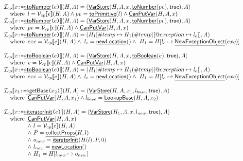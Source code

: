 \documentclass{article}
\makeatletter
\newcommand{\SF}[1]{\mbox{\textsf{#1}}}
\newcommand{\TT}[1]{\mbox{\texttt{#1}}}
\newcommand{\wherec}[1]{{\rm where}\begin{array}[t]{l}#1\end{array}}
\newcommand{\I}{\mathcal{I}}
\newcommand{\V}{\mathcal{V}}
\newcommand{\lbr}{\llbracket}
\newcommand{\rbr}{\rrbracket}
\newcommand{\hfi}[1]{\hf{\ensuremath{\diamond}#1}}
\newcommand{\hf}[1]{\underline{\sf #1}}
\newcommand{\varloc}[1]{\##1}
\newcommand{\varprop}[1]{@#1}
\newcommand{\vtrue}{\SF{true}}
\makeatother
\begin{document}
\[
\begin{array}{ll}

\I _{cp}\lbr x \TT{:=} \hfi{toNumber}\TT{(}e\TT{)} \rbr(H,A)
= (\hf{VarStore}(H,A,x,\hf{toNumber}(pv),\vtrue), A)
\\\quad\wherec{l = \V _{cp}\lbr e\rbr(H,A)\land pv=\hf{toPrimitive}(l)\land \hf{CanPutVar}(H,A,x)}\\
\I _{cp}\lbr x \TT{:=} \hfi{toNumber}\TT{(}e\TT{)} \rbr(H,A)
= (\hf{VarStore}(H,A,x,\hf{toNumber}(pv),\vtrue), A)
\\\quad\wherec{pv = \V _{cp}\lbr e\rbr(H,A)\land \hf{CanPutVar}(H,A,x)}\\
\I _{cp}\lbr x \TT{:=} \hfi{toNumber}\TT{(}e\TT{)} \rbr(H,A)
 = (H_1[\varloc{temp}\mapsto H_1(\varloc{temp})[\varprop{exception}\mapsto l_{e}]], A) \\
\quad\wherec{
  exc = \V_{cp}\lbr e\rbr(H,A) 
  \land\ l_e = \hf{newLocation}()
  \land\ H_1=H[l_e\mapsto\hf{NewExceptionObject}(exc)] \\
}
\\\\

\I _{cp}\lbr x \TT{:=} \hfi{toBoolean}\TT{(}e\TT{)} \rbr(H,A)
= (\hf{VarStore}(H,A,x,\hf{toBoolean}(v),\vtrue), A)
\\\quad\wherec{v = \V _{cp}\lbr e\rbr(H,A)\land \hf{CanPutVar}(H,A,x)}\\
\I _{cp}\lbr x \TT{:=} \hfi{toBoolean}\TT{(}e\TT{)} \rbr(H,A)
 = (H_1[\varloc{temp}\mapsto H_1(\varloc{temp})[\varprop{exception}\mapsto l_{e}]], A) \\
\quad\wherec{
  exc = \V_{cp}\lbr e\rbr(H,A) 
  \land\ l_e = \hf{newLocation}()
  \land\ H_1=H[l_e\mapsto\hf{NewExceptionObject}(exc)] \\
}
\\\\

\I _{cp}\lbr x_1 \TT{:=} \hfi{getBase}\TT{(}x_2\TT{)} \rbr(H,A)
 = (\hf{VarStore}(H,A,x_1,l_{base},\vtrue),A) \\
\quad\wherec{\hf{CanPutVar}(H,A,x_1)\land l_{base}=\hf{LookupBase}(H,A,x_2)}
\\\\

\I _{cp}\lbr x \TT{:=} \hfi{iteratorInit}\TT{(}e\TT{)} \rbr(H,A)
 = (\hf{VarStore}(H_1,A,x,l_{new},\vtrue),A) \\
  \quad\wherec{\hf{CanPutVar}(H,A,x) \\
  \land\ l = \V_{cp}\lbr e\rbr(H,A) \\
  \land\ P = \hf{collectProps}(H,l) \\
  \land\ o_{new} = \hf{iteratorInit}(H(l), P, 0) \\
  \land\ l_{new} = \hf{newLocation}() \\
  \land\ H_1 = H[l_{new}\mapsto o_{new}] \\
  }
\\\\


\end{array}\]
\end{document}
